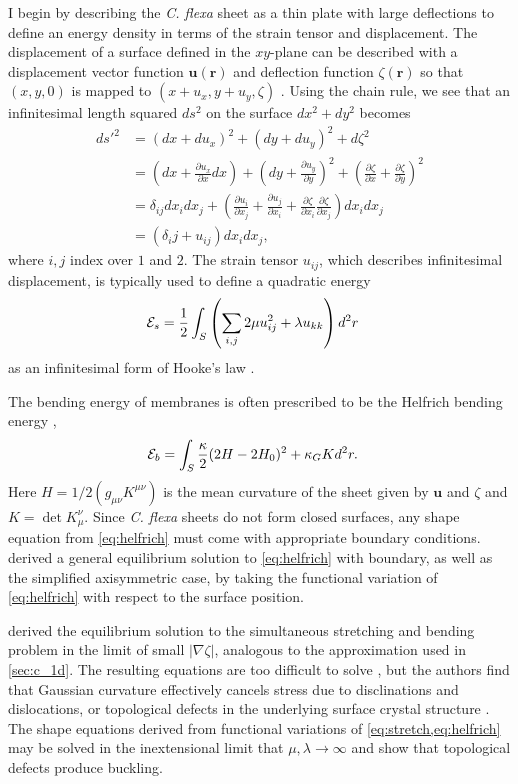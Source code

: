I begin by describing the \textit{C. flexa} sheet as a thin plate with large deflections to define an energy density in terms of the strain tensor and displacement.
The displacement of a surface defined in the $xy$-plane can be described with a displacement vector function $\bm{u}(\bm{r})$ and deflection function $\zeta(\bm{r})$ so that $(x, y, 0)$ is mapped to $(x + u_x, y + u_y, \zeta)$ \citep{landau1986}.
Using the chain rule, we see that an infinitesimal length squared $ds^2$ on the surface $dx^2 + dy^2$ becomes 
\begin{align*}
	d{s'}^2 &= (dx + du_x)^2 + (dy + du_y)^2 + d\zeta^2 \\
	&= \left(dx + \frac{\partial u_x}{\partial x} dx\right)+ \left(dy + \frac{\partial u_y}{\partial y} \right)^2 + \left(\frac{\partial\zeta}{\partial x} + \frac{\partial\zeta}{\partial y} \right)^2 \\
	&= \delta_{ij} dx_i dx_j + \left(\frac{\partial u_i}{\partial x_j} + \frac{\partial u_j}{\partial x_i} + \frac{\partial \zeta}{\partial x_i} \frac{\partial \zeta}{\partial x_j}\right) dx_i dx_j \\
	&= (\delta_ij + u_{ij}) dx_i dx_j,
\end{align*}
where $i,j$ index over $1$ and $2$. The strain tensor $u_{ij}$, which describes infinitesimal displacement, is typically used to define a quadratic energy 
\begin{align}
	\mathcal{E}_s &= \frac{1}{2} \int_S \left( \sum_{i,j}2\mu u_{ij}^2 + \lambda u_{kk} \right) d^2r \label{eq:stretch}
\end{align}
as an infinitesimal form of Hooke's law \citep{landau1986}. 

The bending energy of membranes is often prescribed to be the Helfrich bending energy \citep{helfrich1973},
\begin{align}
	\mathcal{E}_b &= \int_S \frac{\kappa}{2} (2H - 2H_0)^2 + \kappa_G K d^2r. \label{eq:helfrich}	
\end{align}
\noindent Here $H=1/2 (g_{\mu\nu}K^{\mu\nu})$ is the mean curvature of the sheet given by $\bm{u}$ and $\zeta$ and $K = \det K_\mu^\nu$. 
Since \textit{C. flexa} sheets do not form closed surfaces, any shape equation from \cref{eq:helfrich} must come with appropriate boundary conditions. 
\citet{tu2003} derived a general equilibrium solution to \cref{eq:helfrich} with boundary, as well as the simplified axisymmetric case, by taking the functional variation of \cref{eq:helfrich} with respect to the surface position.

\citet{seung1988} derived the equilibrium solution to the simultaneous stretching and bending problem in the limit of small $|\nabla \zeta|$, analogous to the approximation used in \cref{sec:c_1d}.
The resulting equations are too difficult to solve \citep{landau1986}, but the authors find that Gaussian curvature effectively cancels stress due to disclinations and dislocations, or topological defects in the underlying surface crystal structure \citep{sachdev1984}.
The shape equations derived from functional variations of \cref{eq:stretch,eq:helfrich} may be solved in the inextensional limit that $\mu,\lambda \to\infty$ and show that topological defects produce buckling.

